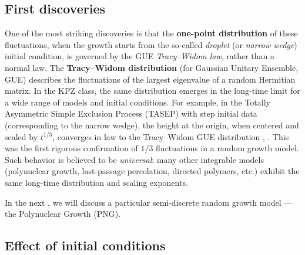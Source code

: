 \documentclass[letterpaper,11pt,oneside,reqno]{book}
\numberwithin{equation}{chapter}  %
\theoremstyle{definition}
\begin{document}
\subsection{First discoveries}

One of the most striking discoveries is that the
\textbf{one-point distribution} of these fluctuations,
when the growth starts from the so-called
\emph{droplet} (or \emph{narrow wedge}) initial condition,
is
governed by the GUE \emph{Tracy–Widom law},
rather than a normal law. The \textbf{Tracy–Widom
distribution} (for Gaussian Unitary Ensemble, GUE) describes
the fluctuations of the largest eigenvalue of a random
Hermitian matrix. In the KPZ class, the same distribution
emerges in the long-time limit for a wide range of models
and initial conditions. For example,
in the Totally Asymmetric Simple Exclusion Process
(TASEP) with step initial data (corresponding to the narrow wedge), the height at the
origin, when centered and scaled by $t^{1/3}$, converges in
law to the Tracy–Widom GUE distribution
\cite{johansson2000shape},
\cite{remenik2023integrable}.
This was the first rigorous confirmation of $1/3$
fluctuations in a random growth model.
Such behavior is believed
to be \emph{universal}: many other integrable models
(polynuclear growth, last-passage percolation, directed
polymers, etc.) exhibit the same long-time distribution and
scaling exponents.

In the next , we will discuss a particular semi-discrete random
growth model --- the Polynuclear Growth (PNG).

\subsection{Effect of initial conditions}
\end{document}
